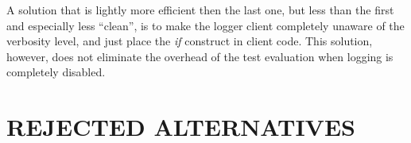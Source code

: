 \documentclass[a4paper,twoside]{tce}
\begin{document}
A solution that is lightly more efficient then the last one, but less than
the first and especially less ``clean'', is to make the logger client
completely unaware of the verbosity level, and just place the \emph{if}
construct in client code. This solution, however, does not eliminate the
overhead of the test evaluation when logging is completely disabled.



\chapter{REJECTED ALTERNATIVES}

\end{document}

